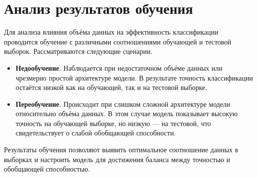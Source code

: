 \section{Анализ результатов обучения}
Для анализа влияния объёма данных на эффективность классификации проводится обучение с различными соотношениями обучающей и тестовой выборок. Рассматриваются следующие сценарии.
\begin{itemize}[label*=---]
	\item \textbf{Недообучение}. Наблюдается при недостаточном объёме данных или чрезмерно простой архитектуре модели. В результате точность классификации остаётся низкой как на обучающей, так и на тестовой выборке.
	\item \textbf{Переобучение}. Происходит при слишком сложной архитектуре модели относительно объёма данных. В этом случае модель показывает высокую точность на обучающей выборке, но низкую — на тестовой, что свидетельствует о слабой обобщающей способности.
\end{itemize}
Результаты обучения позволяют выявить оптимальное соотношение данных в выборках и настроить модель для достижения баланса между точностью и обобщающей способностью.

\clearpage
